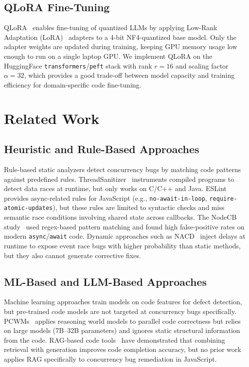 \documentclass[runningheads]{llncs}
\begin{document}
\subsection{QLoRA Fine-Tuning}
\label{sec:bg:qlora}

QLoRA~\cite{qlora} enables fine-tuning of quantized LLMs by applying
Low-Rank Adaptation (LoRA)~\cite{lora} adapters to a 4-bit NF4-quantized base model.
Only the adapter weights are updated during training, keeping GPU memory
usage low enough to run on a single laptop GPU.
We implement QLoRA on the HuggingFace \texttt{transformers}/\texttt{peft}
stack with rank $r = 16$ and scaling factor $\alpha = 32$, which provides
a good trade-off between model capacity and training efficiency for
domain-specific code fine-tuning.

\section{Related Work}
\label{sec:related}

\subsection{Heuristic and Rule-Based Approaches}
\label{sec:related:rules}

Rule-based static analyzers detect concurrency bugs by matching code
patterns against predefined rules.
ThreadSanitizer~\cite{threadsanitizer} instruments compiled programs to
detect data races at runtime, but only works on C/C++ and Java.
ESLint~\cite{eslint} provides async-related rules for JavaScript (e.g., \texttt{no-await-in-loop},
\texttt{require-atomic-updates}), but these rules are limited to syntactic
checks and miss semantic race conditions involving shared state across
callbacks.
The NodeCB study~\cite{nodecb2017} used regex-based pattern matching and
found high false-positive rates on modern \texttt{async}/\texttt{await} code.
Dynamic approaches such as NACD~\cite{nacd2025} inject delays at runtime to
expose event race bugs with higher probability than static methods, but they
also cannot generate corrective fixes.

\subsection{ML-Based and LLM-Based Approaches}
\label{sec:related:ml}

Machine learning approaches train models on code features for defect
detection, but pre-trained code models are not targeted at concurrency
bugs specifically.
PCWMs~\cite{pcwms2026} applies reasoning world models to parallel code
correctness but relies on large models (7B--32B parameters) and ignores
static structural information from the code.
RAG-based code tools~\cite{rag_survey} have demonstrated that combining
retrieval with generation improves code completion accuracy, but no prior
work applies RAG specifically to concurrency bug remediation in JavaScript.
\end{document}
